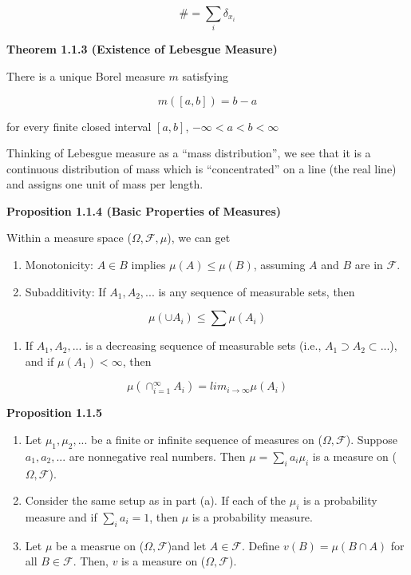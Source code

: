 \documentclass[
]{book}
\providecommand{\tightlist}{%
  \setlength{\itemsep}{0pt}\setlength{\parskip}{0pt}}
\begin{document}
\[\# =\sum_i \delta_{x_i}\]

\textbf{Theorem 1.1.3 (Existence of Lebesgue Measure)}

There is a unique Borel measure \(m\) satisfying

\[m([a,b])=b-a\]

for every finite closed interval \([a,b]\), \(-\infty<a<b< \infty\)

Thinking of Lebesgue measure as a ``mass distribution'', we see that it is a continuous distribution of mass which is ``concentrated'' on a line (the real line) and assigns one unit of mass per length.

\textbf{Proposition 1.1.4 (Basic Properties of Measures)}

Within a measure space (\(\Omega, \mathcal{F}, \mu\)), we can get

\begin{enumerate}
\def\labelenumi{(\alph{enumi})}
\item
  Monotonicity: \(A \in B\) implies \(\mu(A) \leq \mu(B)\), assuming \(A\) and \(B\) are in \(\mathcal{F}\).
\item
  Subadditivity: If \(A_1, A_2,...\) is any sequence of measurable sets, then
\end{enumerate}

\[\mu(\cup A_i) \leq \sum \mu (A_i)\]

\begin{enumerate}
\def\labelenumi{(\alph{enumi})}
\setcounter{enumi}{2}
\tightlist
\item
  If \(A_1, A_2,...\) is a decreasing sequence of measurable sets (i.e., \(A_1 \supset A_2 \subset ...\)), and if \(\mu(A_1) < \infty\), then
\end{enumerate}

\[\mu(\cap_{i=1}^\infty A_i)=lim_{i \rightarrow\infty} \mu(A_i)\]

\textbf{Proposition 1.1.5}

\begin{enumerate}
\def\labelenumi{(\alph{enumi})}
\item
  Let \(\mu_1, \mu_2,...\) be a finite or infinite sequence of measures on (\(\Omega, \mathcal{F}\)). Suppose \(a_1, a_2,...\) are nonnegative real numbers. Then \(\mu=\sum_i a_i \mu_i\) is a measure on (\(\Omega, \mathcal{F}\)).
\item
  Consider the same setup as in part (a). If each of the \(\mu_i\) is a probability measure and if \(\sum_i a_i =1\), then \(\mu\) is a probability measure.
\item
  Let \(\mu\) be a measrue on (\(\Omega, \mathcal{F}\))and let \(A \in \mathcal{F}\). Define \(v(B)=\mu(B \cap A)\) for all \(B \in \mathcal{F}\). Then, \(v\) is a measure on (\(\Omega, \mathcal{F}\)).
\end{enumerate}
\end{document}
